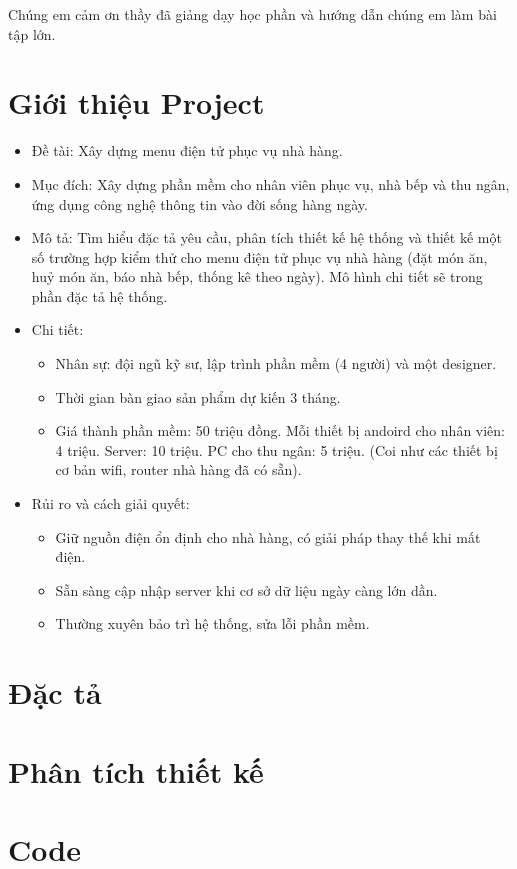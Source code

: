 \documentclass[a4paper,12pt]{report}
\begin{document}
Chúng em cảm ơn thầy đã giảng dạy học phần và hướng dẫn chúng em làm bài tập lớn.

\chapter{Giới thiệu Project}
\begin{itemize}
\item Đề tài: Xây dựng menu điện tử phục vụ nhà hàng. 
\item Mục đích: Xây dựng phần mềm cho nhân viên phục vụ, nhà bếp và thu ngân, ứng dụng công nghệ thông tin vào đời sống hàng ngày.
\item Mô tả: Tìm	hiểu đặc	tả yêu	cầu,	phân	tích	thiết kế hệ thống	và	thiết	kế một	số
trường	hợp	kiểm	thử cho menu	điện	tử phục	vụ nhà	hàng (đặt	món	ăn,	huỷ món	
ăn,	báo	nhà	bếp,	thống	kê	theo	ngày). Mô hình chi tiết sẽ trong phần đặc tả hệ thống.
\item Chi tiết:
\begin{itemize}
       \item Nhân sự: đội ngũ kỹ sư, lập trình phần mềm (4 người) và một designer.
       \item Thời gian bàn giao sản phẩm dự kiến 3 tháng.
       \item Giá thành phần mềm: 50 triệu đồng. Mỗi thiết bị andoird cho nhân viên: 4 triệu. Server: 10 triệu. PC cho thu ngân: 5 triệu. (Coi như các thiết bị cơ bản wifi, router nhà hàng đã có sẵn).
      \end{itemize}
\item Rủi ro và cách giải quyết:
\begin{itemize}
        \item{Giữ nguồn điện ổn định cho nhà hàng, có giải pháp thay thế khi mất điện.}
        \item{Sẵn sàng cập nhập server khi cơ sở dữ liệu ngày càng lớn dần.}
        \item{Thường xuyên bảo trì hệ thống, sửa lỗi phần mềm.}
      \end{itemize}
\end{itemize}


\chapter{Đặc tả}
\chapter{Phân tích thiết kế}
\chapter{Code}
\end{document}
